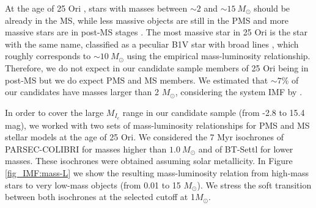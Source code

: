 \documentclass[12pt]{article}
\newcounter{subsubsubsection}[subsubsection]
\begin{document}
\label{sec_IMF:mass-luminosity}
At the age of 25 Ori \citep[7-10 Myr; ][]{Briceno2005,Briceno2007,Downes2014,Briceno2018}, stars with masses between $\sim 2$ and $\sim 15\ M_\odot$ should be already in the MS, while less massive objects are still in the PMS and more massive stars are in post-MS stages \citep[][]{Prialnik2000}. The most massive star in 25 Ori is the star with the same name, classified as a peculiar B1V star with broad lines \citep{Houk1999}, which roughly corresponds to $\sim 10\ M_\odot$ using the \citet{Schmidt-Kaler1982} empirical mass-luminosity relationship. Therefore, we do not expect in our candidate sample members of 25 Ori being in post-MS but we do expect PMS and MS members. We estimated that $\sim7$\% of our candidates have masses larger than 2 $M_\odot$, considering the system IMF by \citet{Downes2014}.

In order to cover the large $M_{I_c}$ range in our candidate sample (from -2.8 to 15.4 mag), we worked with two sets of mass-luminosity relationships for PMS and MS stellar models at the age of 25 Ori. We considered the 7 Myr isochrones of PARSEC-COLIBRI for masses higher than $1.0\ M_\odot$ and of BT-Settl for lower masses. These isochrones were obtained assuming solar metallicity. In Figure \ref{fig_IMF:mass-L} we show the resulting mass-luminosity relation from high-mass stars to very low-mass objects (from 0.01 to 15 $M_\odot$). We stress the soft transition between both isochrones at the selected cutoff at 1$M_\odot$. 
\end{document}
